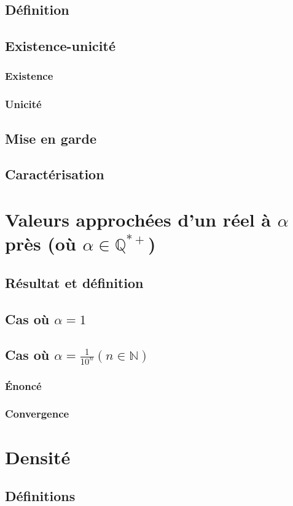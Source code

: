 \documentclass[12pt,a4paper,french]{book}
\begin{document}
		\subsection{Définition}
		\subsection{Existence-unicité}
			\subsubsection{Existence}
			\subsubsection{Unicité}
		\subsection{Mise en garde}
		\subsection{Caractérisation}
	\section{Valeurs approchées d'un réel à $\alpha$ près (où $\alpha \in \mathbb{Q}^{\ast+}$)}
		\subsection{Résultat et définition}
		\subsection{Cas où $\alpha = 1$}
		\subsection{Cas où $\alpha = \frac{1}{10^{n}} (n \in \mathbb{N})$}
			\subsubsection{Énoncé}
			\subsubsection{Convergence}
	\section{Densité}
		\subsection{Définitions}
\end{document}
